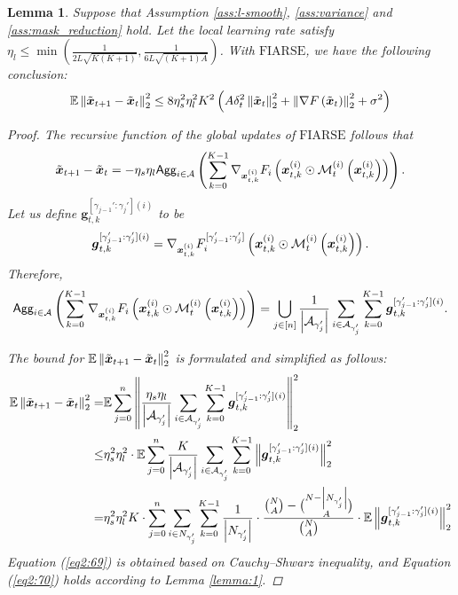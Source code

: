 \documentclass{article}
\theoremstyle{plain}
\newtheorem{lemma}[theorem]{Lemma}
\theoremstyle{definition}
\theoremstyle{remark}
\newcommand{\algo}{\ensuremath{\text{FIARSE}}\xspace}
\newcommand{\E}{\mathbb{E}}
\renewcommand{\eqref}[1]{Equation (\ref{#1})}
\newcommand{\bracket}[1]{\left(#1\right)}
\newcommand{\norm}[1]{\left\|#1\right\|_2^2}
\begin{document}
\begin{lemma} \label{lemma:4}
Suppose that Assumption \ref{ass:l-smooth}, \ref{ass:variance} and \ref{ass:mask_reduction} hold. Let the local learning rate satisfy $\eta_l \leq \min \bracket{\frac{1}{2L\sqrt{K(K+1)}}, \frac{1}{6L\sqrt{(K+1) A}}}$. With \algo, we have the following conclusion: 
\begin{align}
\E \norm{\x{t+1} - \x{t}} \leq 8 \eta_s^2 \eta_l^2 K^2 \bracket{A \delta_t^2 \norm{\x{t}} + \norm{\grad{t}} + \sigma^2}
\end{align}
\begin{proof}
The recursive function of the global updates of \algo follows that 
\begin{align}
\x{t+1} - \x{t} = - \eta_s \eta_l \agg{i \in \participant} \bracket{\sum_{k=0}^{K-1} \newmaskgrad{i}{t}{k}}.
\end{align}
Let us define $\boldsymbol{g}_{t,k}^{[\gamma_{j-1}':\gamma_{j}'](i)}$ to be
\begin{align}
\boldsymbol{g}_{t,k}^{[\gamma_{j-1}':\gamma_{j}'](i)} = \newmaskgrad{i}{t}{k}{j}.
\end{align}
Therefore,
\begin{align}
\agg{i \in \participant} \bracket{\sum_{k=0}^{K-1} \newmaskgrad{i}{t}{k}} = \bigcup_{j \in [n]} \frac{1}{\left|\a{j}\right|} \sum_{i \in \a{j}} \sum_{k=0}^{K-1} \boldsymbol{g}_{t,k}^{[\gamma_{j-1}':\gamma_{j}'](i)}.
\end{align}

The bound for $\E \norm{\x{t+1} - \x{t}}$ is formulated and simplified as follows: 
\begin{align}
\E \norm{\x{t+1} - \x{t}} = &\E \sum_{j=0}^{n} \norm{\frac{\eta_s \eta_l}{\left|\a{j}\right|} \sum_{i \in \a{j}} \sum_{k=0}^{K-1} \boldsymbol{g}_{t,k}^{[\gamma_{j-1}':\gamma_{j}'](i)} } \\
\leq & \eta_s^2 \eta_l^2 \cdot \E \sum_{j=0}^{n} \frac{K}{\left|\a{j}\right|} \sum_{i \in \a{j}} \sum_{k=0}^{K-1} \norm{\boldsymbol{g}_{t,k}^{[\gamma_{j-1}':\gamma_{j}'](i)}} \label{eq2:69} \\
= & \eta_s^2 \eta_l^2 K \cdot \sum_{j=0}^{n} \sum_{i \in \n{j}} \sum_{k=0}^{K-1} \frac{1}{\left|\n{j}\right|} \cdot \frac{\binom{N}{A} - \binom{N - \left|\n{j}\right|}{A}}{\binom{N}{A}} \cdot \E \norm{\boldsymbol{g}_{t,k}^{[\gamma_{j-1}':\gamma_{j}'](i)}} \label{eq2:70} 
\end{align}
\eqref{eq2:69} is obtained based on Cauchy–Shwarz inequality, and \eqref{eq2:70} holds according to Lemma \ref{lemma:1}. 


\end{proof}
\end{lemma}
\end{document}
